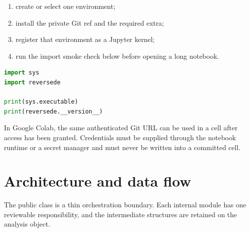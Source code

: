 \documentclass[10pt,a4paper,oneside]{article}
\begin{document}
\begin{enumerate}
  \item create or select one environment;
  \item install the private Git ref and the required extra;
  \item register that environment as a Jupyter kernel;
  \item run the import smoke check below before opening a long notebook.
\end{enumerate}

\begin{lstlisting}[language=Python]
import sys
import reversede

print(sys.executable)
print(reversede.__version__)
\end{lstlisting}

In Google Colab, the same authenticated Git URL can be used in a cell after access has been granted.
Credentials must be supplied through the notebook runtime or a secret manager and must never be
written into a committed cell.

\section{Architecture and data flow}\label{sec:architecture}

The public class is a thin orchestration boundary. Each internal module has one reviewable
responsibility, and the intermediate structures are retained on the analysis object.

\begin{center}
\end{center}
\end{document}
